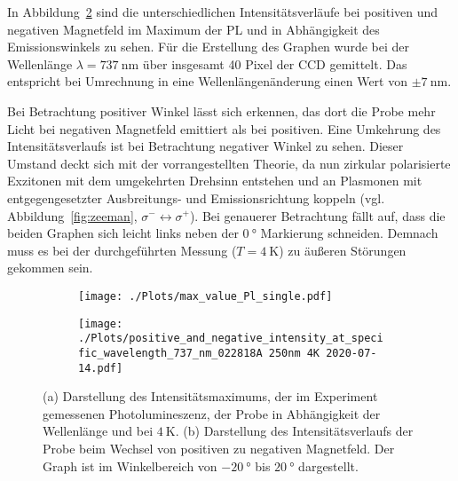 In Abbildung~\ref{fig:i_pn} sind die unterschiedlichen Intensitätsverläufe bei positiven und negativen
Magnetfeld im Maximum der PL und in Abhängigkeit des Emissionswinkels zu sehen.
Für die Erstellung des Graphen wurde bei der Wellenlänge $\lambda = \SI{737}{\nano\meter}$ 
über insgesamt 40 Pixel der CCD gemittelt.
Das entspricht bei Umrechnung in eine Wellenlängenänderung einen Wert von $\pm \SI{7}{\nano\meter}$.

Bei Betrachtung positiver Winkel lässt sich erkennen, das dort die Probe mehr Licht bei negativen
Magnetfeld emittiert als bei positiven.
Eine Umkehrung des Intensitätsverlaufs ist bei Betrachtung negativer Winkel zu sehen.
Dieser Umstand deckt sich mit der vorrangestellten Theorie, da nun zirkular polarisierte Exzitonen mit dem 
umgekehrten Drehsinn entstehen und an Plasmonen mit entgegengesetzter Ausbreitungs- und Emissionsrichtung koppeln
(vgl. Abbildung~\ref{fig:zeeman}, $\sigma^- \leftrightarrow \sigma^+$).
Bei genauerer Betrachtung fällt auf, dass die beiden Graphen sich leicht links neben der $\SI{0}{\degree}$
Markierung schneiden.
Demnach muss es bei der durchgeführten Messung ($T = \SI{4}{\kelvin}$) zu äußeren Störungen gekommen sein.
\begin{figure}
    \begin{subfigure}{0.5\textwidth}
        \texttt{[image: ./Plots/max\_value\_Pl\_single.pdf]}
        \caption{}
        \label{fig:max}
    \end{subfigure}
    \begin{subfigure}{0.5\textwidth}
        \texttt{[image: ./Plots/positive\_and\_negative\_intensity\_at\_specific\_wavelength\_737\_nm\_022818A 250nm 4K 2020-07-14.pdf]}
        \caption{}
        \label{fig:i_pn}
    \end{subfigure}
    \caption{(a) Darstellung des Intensitätsmaximums, der im Experiment gemessenen Photolumineszenz,
             der Probe in Abhängigkeit der Wellenlänge und bei $\SI{4}{\kelvin}$.
             (b) Darstellung des Intensitätsverlaufs der Probe beim Wechsel von positiven zu negativen Magnetfeld.
             Der Graph ist im Winkelbereich von $\SI{-20}{\degree}$ bis $\SI{20}{\degree}$ dargestellt.
              }
    \label{fig:rho}
\end{figure}
\FloatBarrier
